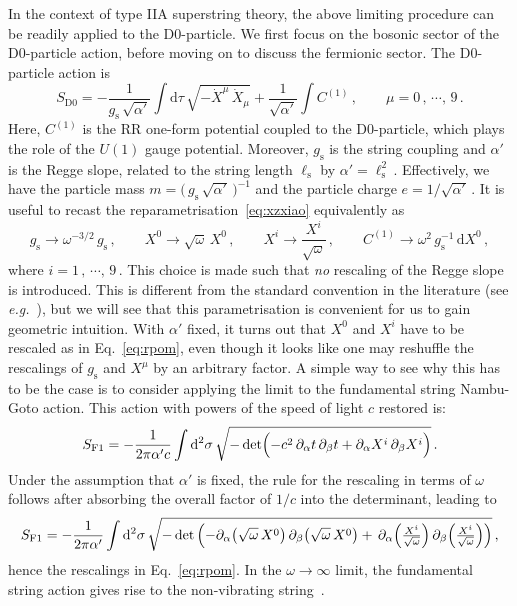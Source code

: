 \documentclass[11pt]{article}
\newcommand{\be}{\begin{equation}}
\newcommand{\ee}{\end{equation}}
\newcommand{\p}{\partial}
\renewcommand{\emph}[1]{\textit{#1}}
\newcommand{\dd}{\mathrm{d}}
\begin{document}
In the context of type IIA superstring theory, the above limiting procedure can be readily applied to the D0-particle. We first focus on the bosonic sector of the D0-particle action, before moving on to discuss the fermionic sector. The D0-particle action is
%
\be \label{eq:dzpabs}
    S_\text{D0} = - \frac{1}{g_\text{s} \, \sqrt{\alpha'}} \int \dd\tau \, \sqrt{- \dot{X}^\mu_{\phantom{\dagger}} \, \dot{X}_\mu} + \frac{1}{\sqrt{\alpha'}} \int C^{(1)}\,,
        \qquad%
    \mu = 0\,, \, \cdots, \, 9\,.
\ee
%
Here, $C^{(1)}$ is the RR one-form potential coupled to the D0-particle, which plays the role of the $U(1)$ gauge potential. Moreover, $g_\text{s}$ is the string coupling and $\alpha'$ is the Regge slope, related to the string length $\ell_\text{s}$ by $\alpha' = \ell_\text{s}^2$\,. Effectively, we have the particle mass $m = \bigl(\,g_\text{s} \, \sqrt{\alpha'}\,\bigr)^{-1}$ and the particle charge $e = 1 / \sqrt{\alpha'}$\,. It is useful to recast the reparametrisation~\eqref{eq:xzxiao} equivalently as
%
\be \label{eq:rpom}
    g^{}_\text{s} \rightarrow \omega^{-3/2} \, g^{}_\text{s}\,,
        \qquad%
    X^0 \rightarrow \sqrt{\omega} \, X^0\,,
        \qquad%
    X^i \rightarrow \frac{X^i}{\sqrt{\omega}}\,,
        \qquad%
    C^{(1)} \rightarrow \omega^2 \, g_\text{s}^{-1} \, \dd X^0\,,
\ee
%
where $i = 1\,, \, \cdots, \, 9$\,. 
This choice is made such that \emph{no} rescaling of the Regge slope is introduced. This is different from the standard convention in the literature (see \emph{e.g.}~\cite{Gopakumar:2000ep}), but we will see that this parametrisation is convenient for us to gain geometric intuition. 
With $\alpha'$ fixed, it turns out that $X^0$ and $X^i$ have to be rescaled as in Eq.~\eqref{eq:rpom}, even though it looks like one may reshuffle the rescalings of $g^{}_\text{s}$ and $X^\mu$ by an arbitrary factor. A simple way to see why this has to be the case is to consider applying the limit to the fundamental string Nambu-Goto action.
This action with powers of the speed of light $c$ restored is: 
%
\be
    S_\text{F1} = - \frac{1}{2\pi \alpha' c} \int \dd^2 \sigma \, \sqrt{- \det \Bigl( - c^2 \, \p_\alpha t \, \p_\beta t + \p_\alpha X^i \, \p_\beta X^i \Bigr)}\,.
\ee
%
Under the assumption that $\alpha'$ is fixed, the rule for the rescaling in terms of $\omega$ follows after absorbing the overall factor of $1/c$ into the determinant, leading to 
%
\be \label{eq:fsa}
    S_\text{F1} = - \frac{1}{2\pi\alpha'} \int \dd^2 \sigma \, \sqrt{-\det\left(- \p_\alpha \bigl( \sqrt{\omega} \, X^0 \bigr) \, \p_\beta \bigl( \sqrt{\omega} \, X^0 \bigr) + \, \p_\alpha \Bigl( \tfrac{X^i}{\sqrt{\omega}} \Bigr) \, \p_\beta \Bigl( \tfrac{X^i}{\sqrt{\omega}} \Bigr)\right)}\,,
\ee
%
hence the rescalings in Eq.~\eqref{eq:rpom}. In the $\omega \rightarrow \infty$ limit, the fundamental string action gives rise to the non-vibrating string~\cite{Batlle:2016iel, Gomis:2023eav}. 
\end{document}
